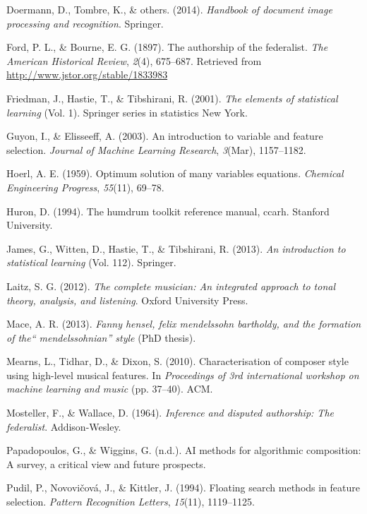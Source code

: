 \documentclass[12pt,twoside]{reedthesis}
\theoremstyle{definition}
\theoremstyle{definition}
\theoremstyle{definition}
\theoremstyle{remark}
\begin{document}
\hypertarget{ref-OMR}{}
Doermann, D., Tombre, K., \& others. (2014). \emph{Handbook of document
image processing and recognition}. Springer.

\hypertarget{ref-authorshipfed}{}
Ford, P. L., \& Bourne, E. G. (1897). The authorship of the federalist.
\emph{The American Historical Review}, \emph{2}(4), 675--687. Retrieved
from \url{http://www.jstor.org/stable/1833983}

\hypertarget{ref-esl}{}
Friedman, J., Hastie, T., \& Tibshirani, R. (2001). \emph{The elements
of statistical learning} (Vol. 1). Springer series in statistics New
York.

\hypertarget{ref-guyon2003}{}
Guyon, I., \& Elisseeff, A. (2003). An introduction to variable and
feature selection. \emph{Journal of Machine Learning Research},
\emph{3}(Mar), 1157--1182.

\hypertarget{ref-hoer}{}
Hoerl, A. E. (1959). Optimum solution of many variables equations.
\emph{Chemical Engineering Progress}, \emph{55}(11), 69--78.

\hypertarget{ref-huron1994humdrum}{}
Huron, D. (1994). The humdrum toolkit reference manual, ccarh. Stanford
University.

\hypertarget{ref-isl}{}
James, G., Witten, D., Hastie, T., \& Tibshirani, R. (2013). \emph{An
introduction to statistical learning} (Vol. 112). Springer.

\hypertarget{ref-laitz}{}
Laitz, S. G. (2012). \emph{The complete musician: An integrated approach
to tonal theory, analysis, and listening}. Oxford University Press.

\hypertarget{ref-mace2013}{}
Mace, A. R. (2013). \emph{Fanny hensel, felix mendelssohn bartholdy, and
the formation of the`` mendelssohnian'' style} (PhD thesis).

\hypertarget{ref-mearns2010}{}
Mearns, L., Tidhar, D., \& Dixon, S. (2010). Characterisation of
composer style using high-level musical features. In \emph{Proceedings
of 3rd international workshop on machine learning and music} (pp.
37--40). ACM.

\hypertarget{ref-mosteller1964inference}{}
Mosteller, F., \& Wallace, D. (1964). \emph{Inference and disputed
authorship: The federalist}. Addison-Wesley.

\hypertarget{ref-papadopoulosai}{}
Papadopoulos, G., \& Wiggins, G. (n.d.). AI methods for algorithmic
composition: A survey, a critical view and future prospects.

\hypertarget{ref-pudil1994floating}{}
Pudil, P., Novovičová, J., \& Kittler, J. (1994). Floating search
methods in feature selection. \emph{Pattern Recognition Letters},
\emph{15}(11), 1119--1125.
\end{document}
